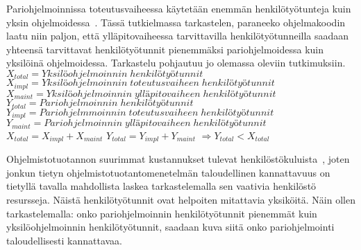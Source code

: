 \documentclass[finnish]{tktltiki2}
\theoremstyle{definition}
\theoremstyle{remark}
\begin{document}
Pariohjelmoinnissa toteutusvaiheessa käytetään enemmän henkilötyötunteja kuin yksin ohjelmoidessa~\cite{costandbenefit2}. Tässä tutkielmassa tarkastelen, paraneeko ohjelmakoodin laatu niin paljon, että ylläpitovaiheessa tarvittavilla henkilötyötunneilla saadaan yhteensä tarvittavat henkilötyötunnit pienemmäksi pariohjelmoidessa kuin yksilöinä ohjelmoidessa. Tarkastelu pohjautuu jo olemassa oleviin tutkimuksiin.\newline\newline
$X_{total} = Yksilöohjelmoinnin\; henkilötyötunnit $\newline
$X_{impl} = Yksilöohjelmoinnin\; toteutusvaiheen\; henkilötyötunnit $\newline
$X_{maint} = Yksilöohjelmoinnin\; ylläpitovaiheen\; henkilötyötunnit $\newline
$Y_{total} = Pariohjelmoinnin\; henkilötyötunnit $\newline
$Y_{impl} = Pariohjelmmoinnin\; toteutusvaiheen\; henkilötyötunnit $\newline
$Y_{maint} = Pariohjelmoinnin\; ylläpitovaiheen\; henkilötyötunnit $\newline
$X_{total} = X_{impl} + X_{maint} $\newline
$Y_{total} = Y_{impl} + Y_{maint} $\newline
$\Rightarrow Y_{total} < X_{total}$ \newline

Ohjelmistotuotannon suurimmat kustannukset tulevat henkilöstökuluista~\cite{haikala1995ohjelmistotuotanto}, joten jonkun tietyn ohjelmistotuotantomenetelmän taloudellinen kannattavuus on tietyllä tavalla mahdollista laskea tarkastelemalla sen vaativia henkilöstö resursseja. Näistä henkilötyötunnit ovat helpoiten mitattavia yksiköitä. Näin ollen tarkastelemalla: onko pariohjelmoinnin henkilötyötunnit pienemmät kuin yksilöohjelmoinnin henkilötyötunnit, saadaan kuva siitä onko pariohjelmointi taloudellisesti kannattavaa.


\end{document}
